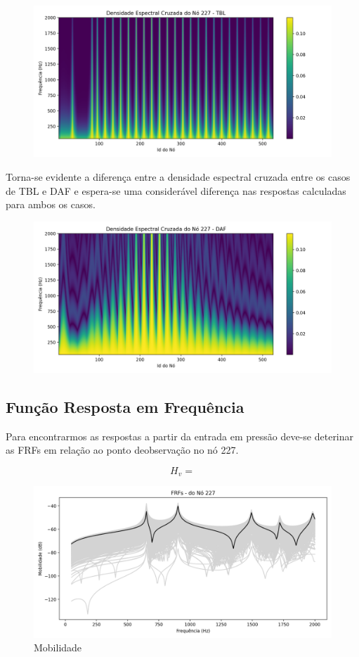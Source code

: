 \documentclass[9pt,a4paper,twoside]{rho-class/rho}
\begin{document}
\begin{figure}[H]
	\centering
	\includegraphics[width=0.9\columnwidth]{figures/csd_TBL.png}
	\caption{}
	\label{fig:csdTBL}
\end{figure}
Torna-se evidente a diferença entre a densidade espectral cruzada entre os casos de TBL e DAF e espera-se uma considerável diferença nas respostas calculadas para ambos os casos.
\begin{figure}[H]
	\centering
	\includegraphics[width=0.9\columnwidth]{figures/csd_DAF.png}
	\caption{}
	\label{fig:csdDAF}
\end{figure}

\subsection{Função Resposta em Frequência}
Para encontrarmos as respostas a partir da entrada em pressão  deve-se deterinar as FRFs em relação ao ponto deobservação no nó 227.

\begin{equation}
	H_v = 
\end{equation}
\begin{figure}[H]
	\centering
	\includegraphics[width=0.9\columnwidth]{figures/frfs.png}
	\caption{Mobilidade}
	\label{fig:frf}
\end{figure}
\end{document}
